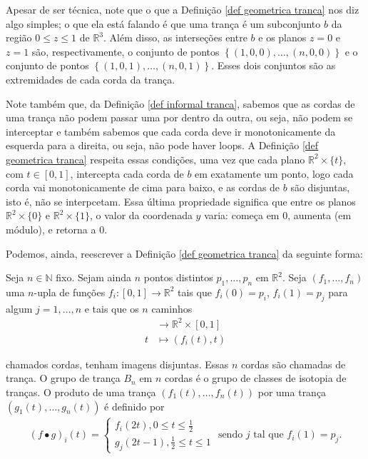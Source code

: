 	\begin{remark}
		Apesar de ser técnica, note que o que a Definição \eqref{def geometrica tranca} nos diz algo simples; 
		o que ela está falando é que uma trança é um subconjunto $b$ da região $0\leq z\leq 1 $ 
		de $\mathbb{R}^3$. Além disso, as interseções entre $b$ e os planos $z = 0$ e $z = 1$ são, 
		respectivamente, o conjunto de pontos $\left\{  (1,0,0), \dots, (n,0,0)\right\}$ e o conjunto de 
		pontos $\left\{ (1,0,1), \dots, (n,0,1) \right\}$. Esses dois conjuntos são as extremidades de 
		cada corda da trança.
		
		\par\vspace{0.3cm} Note também que, da Definição \eqref{def informal tranca}, sabemos que as 
		cordas de uma trança não podem passar uma por dentro da outra, ou seja, não podem se interceptar 
		e também sabemos que cada corda deve ir monotonicamente da esquerda para a direita, ou seja, não pode 
		haver loops. A Definição \eqref{def geometrica tranca} respeita essas condições, uma vez que cada 
		plano $\mathbb{R}^2\times\{t\}$, com $t\in [0,1]$, intercepta cada corda de $b$ em exatamente um ponto,
		logo cada corda vai monotonicamente de cima para baixo, e as cordas de $b$ são disjuntas, isto é, 
		não se interpcetam. Essa última propriedade significa que entre os planos $\mathbb{R}^2\times \{0\}$ 
		e $\mathbb{R}^2\times \{1\}$, o valor da coordenada $y$ varia: começa em $0$, aumenta (em módulo), 
		e retorna a $0$.
	\end{remark}
	\par\vspace{0.3cm} Podemos, ainda, reescrever a Definição \eqref{def geometrica tranca} da seguinte forma:
	\begin{deff}
	\label{outra def geometrica tranca}
		Seja $n\in\mathbb{N}$ fixo. Sejam ainda $n$ pontos distintos $p_1, \dots, p_n$ em $\mathbb{R}^2$. 
		Seja $(f_1, \dots, f_n)$ uma $n$-upla de funções $f_i:[0,1]\to\mathbb{R}^2$ tais que $f_i(0) = p_i$,
		$f_i(1) = p_j$ para algum $j=1,\dots,n$ e tais que os $n$ caminhos 
		\begin{align*}
    		[0,1]&\to\mathbb{R}^2\times[0,1] \\
    		t&\mapsto (f_i(t), t)
		\end{align*}
		\par\vspace{0.3cm} chamados cordas, tenham imagens disjuntas. Essas $n$ cordas são chamadas de trança. 
		O grupo de trança $B_n$ em $n$ cordas é o grupo de classes de isotopia de tranças. O produto de uma 
		trança $( f_1(t), \dots, f_n(t) )$ por uma trança $( g_1(t), \dots, g_n(t) )$ é definido por
		\begin{align}
		\label{def prod trancas}
    		(f\bullet g)_i(t) = 
    		\begin{cases}
        		f_i(2t), 0\leq t\leq \displaystyle{\frac{1}{2}} \\
        		g_j(2t-1), \displaystyle{\frac{1}{2}}\leq t\leq 1
    		\end{cases}\text{ sendo } j \text{ tal que }f_i(1) = p_j.
		\end{align}
	\end{deff}

